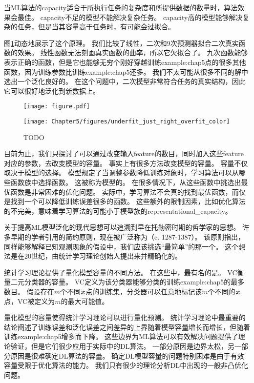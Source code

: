 当\gls{ML}算法的\gls{capacity}适合于所执行任务的复杂度和所提供数据的数量时，算法效果会最佳。
\gls{capacity}不足的模型不能解决复杂任务。
\gls{capacity}高的模型能够解决复杂的任务，但是当其容量高于任务时，有可能会过拟合。

图\ref{fig:chap5_underfit_just_right_overfit}动态地展示了这个原理。
我们比较了线性，二次和$9$次预测器拟合二次真实函数的效果。
线性函数无法刻画真实函数的曲率，所以它欠拟合了。
九次函数能够表示正确的函数，但是它也能够无穷个刚好穿越训练\gls{example:chap5}点的很多其他函数，因为训练参数比训练\gls{example:chap5}还多。
我们不太可能从很多不同的解中选出一个泛化良好的。
在这个问题中，二次模型非常符合任务的真实结构，因此它可以很好地泛化到新数据上。

\begin{figure}[!htb]
\ifOpenSource
\centerline{\texttt{[image: figure.pdf]}}
\else
\centerline{\texttt{[image: Chapter5/figures/underfit\_just\_right\_overfit\_color]}}
\fi
\caption{TODO}
\label{fig:chap5_underfit_just_right_overfit}
\end{figure}


目前为止，我们只探讨了可以通过改变输入\gls{feature}的数目，同时加入这些\gls{feature}对应的参数，去改变模型的容量。
事实上有很多方法改变模型的容量。
容量不仅取决于模型的选择。
模型规定了当调整参数降低训练对象时，学习算法可以从哪些函数族中选择函数。
这被称为模型的。
在很多情况下，从这些函数中挑选出最优函数是非常困难的优化问题。
实际中，学习算法不会真的找到最优函数，而仅是找到一个可以降低训练误差很多的函数。
这些额外的限制因素，比如优化算法的不完美，意味着学习算法的可能小于模型族的\gls{representational_capacity}。


关于提高\gls{ML}模型泛化的现代思想可以追溯到早在托勒密时期的哲学家的思想。
许多早期的学者引用的简约原则，现在被广泛称为（c. 1287-1387）。
该原则指出，同样能够解释已知观测现象的假设中，我们应该挑选“最简单”的那一个。
这个想法是在20世纪，由统计学习理论创始人提出来并精确化的\citep{Vapnik71,Vapnik82,Blumer-et-al-1989,Vapnik95}。

统计学习理论提供了量化模型容量的不同方法。
在这些中，最有名的是。
\gls{VC}衡量二元分类器的容量。
\gls{VC}定义为该分类器能够分类的训练\gls{example:chap5}的最多数目。
假设存在$m$个不同$\boldsymbol{\mathit{x}}$点的训练集，分类器可以任意地标记该$m$个不同的$\boldsymbol{\mathit{x}}$点，\gls{VC}被定义为$m$的最大可能值。

量化模型的容量使得统计学习理论可以进行量化预测。
统计学习理论中最重要的结论阐述了训练误差和泛化误差之间差异的上界随着模型容量增长而增长，但随着训练\gls{example:chap5}增多而下降\citep{Vapnik71,Vapnik82,Blumer-et-al-1989,Vapnik95}。
这些边界为\gls{ML}算法可以有效解决问题提供了理论验证，但是它们很少应用于实际中的\gls{DL}算法。
一部分原因是边界太松，另一部分原因是很难确定\gls{DL}算法的容量。
确定\gls{DL}模型容量的问题特别困难是由于有效容量受限于优化算法的能力。
我们只有很少的理论分析\gls{DL}中出现的一般非凸优化问题。

